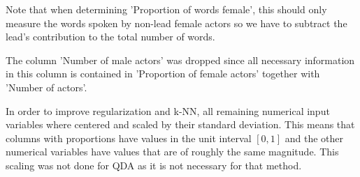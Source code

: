 \documentclass[../../project.tex]{subfiles}
\begin{document}
	Note that when determining 'Proportion of words female', this should only measure the words spoken by non-lead female actors so we have to subtract the lead's contribution to the total number of words.
	
	The column 'Number of male actors' was dropped since all necessary information in this column is contained in 'Proportion of female actors' together with 'Number of actors'.
	
	In order to improve regularization and k-NN, all remaining numerical input variables where centered and scaled by their standard deviation. This means that columns with proportions have values in the unit interval $[0,1]$ and the other numerical variables have values that are of roughly the same magnitude. This scaling was not done for QDA as it is not necessary for that method.
	
\end{document}

